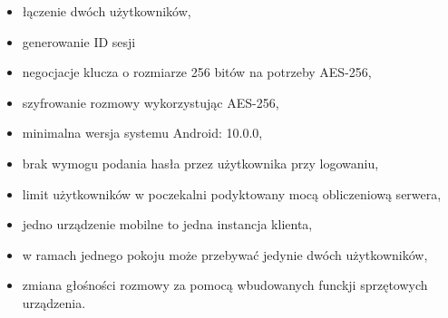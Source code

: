 \begin{itemize}
\item łączenie dwóch użytkowników,
\item generowanie ID sesji
\item negocjacje klucza o rozmiarze 256 bitów na potrzeby AES-256,
\item szyfrowanie rozmowy wykorzystując AES-256,
\item minimalna wersja systemu Android: 10.0.0,
\color{red}
\item brak wymogu podania hasła przez użytkownika przy logowaniu,
\item limit użytkowników w poczekalni podyktowany mocą obliczeniową serwera,
\item jedno urządzenie mobilne to jedna instancja klienta,	\item w ramach jednego pokoju może przebywać jedynie dwóch użytkowników,
\item zmiana głośności rozmowy za pomocą wbudowanych funckji sprzętowych urządzenia.
\end{itemize}
